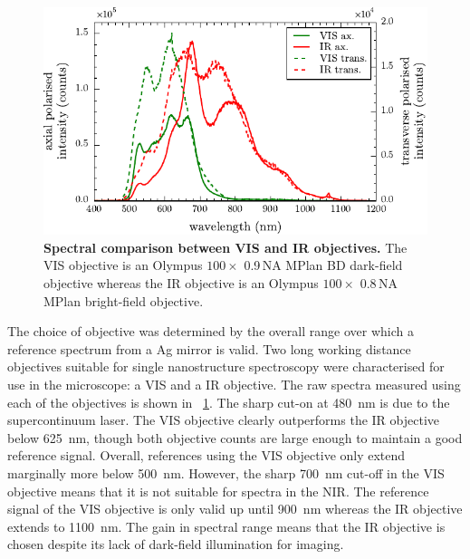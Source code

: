 \documentclass[12pt, a4paper, twoside]{book}
\begin{document}
\begin{figure}[bt]
\centering
\includegraphics{figures/objective_comparison}
\caption*
{\textbf{Spectral comparison between VIS and IR objectives.} The VIS objective is an Olympus $100\times$ 0.9\,NA MPlan BD dark-field objective whereas the IR objective is an Olympus $100\times$ 0.8\,NA MPlan bright-field objective.}
\label{fig:objective_comparison}
\end{figure}

The choice of objective was determined by the overall range over which a reference spectrum from a Ag mirror is valid. Two long working distance objectives suitable for single nanostructure spectroscopy were characterised for use in the microscope: a VIS and a IR objective. The raw spectra measured using each of the objectives is shown in \figurename~\ref{fig:objective_comparison}. The sharp cut-on at \SI{480}{nm} is due to the supercontinuum laser. The VIS objective clearly outperforms the IR objective below \SI{625}{nm}, though both objective counts are large enough to maintain a good reference signal. Overall, references using the VIS objective only extend marginally more below \SI{500}{nm}. However, the sharp \SI{700}{nm} cut-off in the VIS objective means that it is not suitable for spectra in the NIR. The reference signal of the VIS objective is only valid up until \SI{900}{nm} whereas the IR objective extends to \SI{1100}{nm}. The gain in spectral range means that the IR objective is chosen despite its lack of dark-field illumination for imaging.
\end{document}
